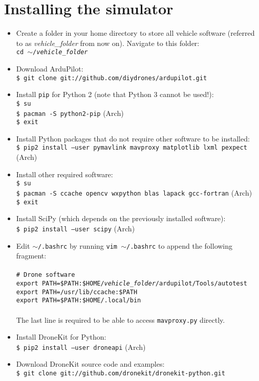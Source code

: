 \documentclass{article}
\newcommand{\arch}{{\color{red} (Arch)}}
\begin{document}
\section*{Installing the simulator}
\begin{itemize}
    \item Create a folder in your home directory to store all vehicle software (referred to
          as \emph{vehicle\_folder} from now on). Navigate to this folder: \\
          {\tt cd $\sim$/\emph{vehicle\_folder}}
    \item Download ArduPilot: \\
          {\tt \$ git clone git://github.com/diydrones/ardupilot.git}
    \item Install {\tt pip} for Python 2 (note that Python 3 cannot be used!): \\
          {\tt \$ su} \\
          {\tt \$ pacman -S python2-pip} \arch{} \\
          {\tt \$ exit}
    \item Install Python packages that do not require other software to be installed: \\
          {\tt \$ pip2 install --user pymavlink mavproxy matplotlib lxml pexpect} \arch{}
    \item Install other required software: \\
          {\tt \$ su} \\
          {\tt \$ pacman -S ccache opencv wxpython blas lapack gcc-fortran} \arch{} \\
          {\tt \$ exit}
    \item Install SciPy (which depends on the previously installed software): \\
          {\tt \$ pip2 install --user scipy} \arch{}
    \item Edit {\tt $\sim$/.bashrc} by running {\tt vim $\sim$/.bashrc} to append the following fragment: \\\\
          {\tt \# Drone software} \\
          {\tt export PATH=\$PATH:\$HOME/\emph{vehicle\_folder}/ardupilot/Tools/autotest} \\
          {\tt export PATH=/usr/lib/ccache:\$PATH} \\
          {\tt export PATH=\$PATH:\$HOME/.local/bin} \\\\
          The last line is required to be able to access {\tt mavproxy.py} directly.
    \item Install DroneKit for Python: \\
          {\tt \$ pip2 install --user droneapi} \arch{}
    \item Download DroneKit source code and examples: \\
          {\tt \$ git clone git://github.com/dronekit/dronekit-python.git}
\end{itemize}
\end{document}
